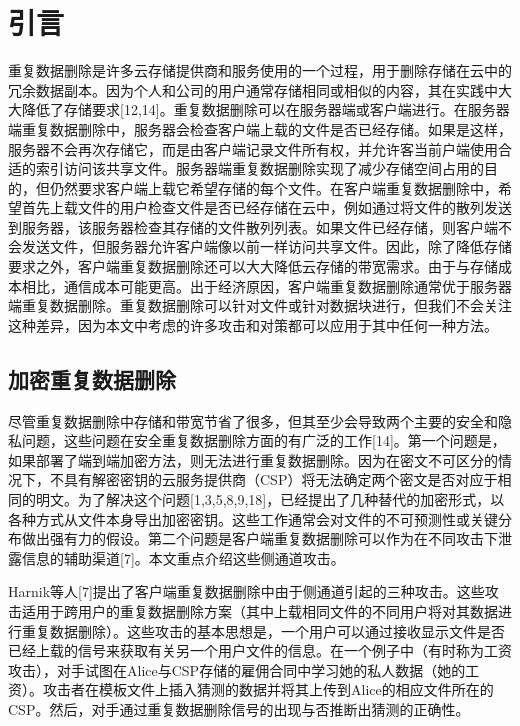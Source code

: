 \section{引言}

重复数据删除是许多云存储提供商和服务使用的一个过程，用于删除存储在云中的冗余数据副本。因为个人和公司的用户通常存储相同或相似的内容，其在实践中大大降低了存储要求[12,14]。重复数据删除可以在服务器端或客户端进行。在服务器端重复数据删除中，服务器会检查客户端上载的文件是否已经存储。如果是这样，服务器不会再次存储它，而是由客户端记录文件所有权，并允许客当前户端使用合适的索引访问该共享文件。服务器端重复数据删除实现了减少存储空间占用的目的，但仍然要求客户端上载它希望存储的每个文件。在客户端重复数据删除中，希望首先上载文件的用户检查文件是否已经存储在云中，例如通过将文件的散列发送到服务器，该服务器检查其存储的文件散列列表。如果文件已经存储，则客户端不会发送文件，但服务器允许客户端像以前一样访问共享文件。因此，除了降低存储要求之外，客户端重复数据删除还可以大大降低云存储的带宽需求。由于与存储成本相比，通信成本可能更高。出于经济原因，客户端重复数据删除通常优于服务器端重复数据删除。重复数据删除可以针对文件或针对数据块进行，但我们不会关注这种差异，因为本文中考虑的许多攻击和对策都可以应用于其中任何一种方法。

\subsection{加密重复数据删除}

尽管重复数据删除中存储和带宽节省了很多，但其至少会导致两个主要的安全和隐私问题，这些问题在安全重复数据删除方面的有广泛的工作[14]。第一个问题是，如果部署了端到端加密方法，则无法进行重复数据删除。因为在密文不可区分的情况下，不具有解密密钥的云服务提供商（CSP）将无法确定两个密文是否对应于相同的明文。为了解决这个问题[1,3,5,8,9,18]，已经提出了几种替代的加密形式，以各种方式从文件本身导出加密密钥。这些工作通常会对文件的不可预测性或关键分布做出强有力的假设。第二个问题是客户端重复数据删除可以作为在不同攻击下泄露信息的辅助渠道[7]。本文重点介绍这些侧通道攻击。

Harnik等人[7]提出了客户端重复数据删除中由于侧通道引起的三种攻击。这些攻击适用于跨用户的重复数据删除方案（其中上载相同文件的不同用户将对其数据进行重复数据删除）。这些攻击的基本思想是，一个用户可以通过接收显示文件是否已经上载的信号来获取有关另一个用户文件的信息。在一个例子中（有时称为工资攻击），对手试图在Alice与CSP存储的雇佣合同中学习她的私人数据（她的工资）。攻击者在模板文件上插入猜测的数据并将其上传到Alice的相应文件所在的CSP。然后，对手通过重复数据删除信号的出现与否推断出猜测的正确性。

